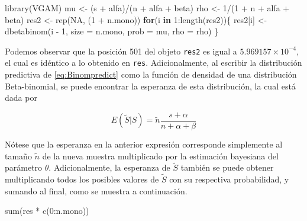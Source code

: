 \documentclass[
  12pt,
  spanish,
]{book}
\newenvironment{Shaded}{\begin{snugshade}}{\end{snugshade}}
\newcommand{\AttributeTok}[1]{\textcolor[rgb]{0.77,0.63,0.00}{#1}}
\newcommand{\ConstantTok}[1]{\textcolor[rgb]{0.00,0.00,0.00}{#1}}
\newcommand{\ControlFlowTok}[1]{\textcolor[rgb]{0.13,0.29,0.53}{\textbf{#1}}}
\newcommand{\DecValTok}[1]{\textcolor[rgb]{0.00,0.00,0.81}{#1}}
\newcommand{\FunctionTok}[1]{\textcolor[rgb]{0.00,0.00,0.00}{#1}}
\newcommand{\NormalTok}[1]{#1}
\newcommand{\OtherTok}[1]{\textcolor[rgb]{0.56,0.35,0.01}{#1}}
\newcommand{\SpecialCharTok}[1]{\textcolor[rgb]{0.00,0.00,0.00}{#1}}
\theoremstyle{definition}
\theoremstyle{definition}
\theoremstyle{definition}
\theoremstyle{definition}
\theoremstyle{remark}
\begin{document}
\begin{Shaded}
\begin{Highlighting}[]
\FunctionTok{library}\NormalTok{(VGAM) }
\NormalTok{mu }\OtherTok{\textless{}{-}}\NormalTok{ (s }\SpecialCharTok{+}\NormalTok{ alfa)}\SpecialCharTok{/}\NormalTok{(n }\SpecialCharTok{+}\NormalTok{ alfa }\SpecialCharTok{+}\NormalTok{ beta)}
\NormalTok{rho }\OtherTok{\textless{}{-}} \DecValTok{1}\SpecialCharTok{/}\NormalTok{(}\DecValTok{1} \SpecialCharTok{+}\NormalTok{ n }\SpecialCharTok{+}\NormalTok{ alfa }\SpecialCharTok{+}\NormalTok{ beta) }
\NormalTok{res2 }\OtherTok{\textless{}{-}} \FunctionTok{rep}\NormalTok{(}\ConstantTok{NA}\NormalTok{, (}\DecValTok{1} \SpecialCharTok{+}\NormalTok{ n.mono)) }
\ControlFlowTok{for}\NormalTok{(i }\ControlFlowTok{in} \DecValTok{1}\SpecialCharTok{:}\FunctionTok{length}\NormalTok{(res2))\{}
\NormalTok{  res2[i] }\OtherTok{\textless{}{-}} \FunctionTok{dbetabinom}\NormalTok{(i }\SpecialCharTok{{-}} \DecValTok{1}\NormalTok{,}
                        \AttributeTok{size =}\NormalTok{ n.mono,}
                        \AttributeTok{prob =}\NormalTok{ mu,}
                        \AttributeTok{rho =}\NormalTok{ rho)}
\NormalTok{\}}
\end{Highlighting}
\end{Shaded}

Podemos observar que la posición 501 del objeto \texttt{res2} es igual a \ensuremath{5.969157\times 10^{-4}}, el cual es idéntico a lo obtenido en \texttt{res}. Adicionalmente, al escribir la distribución predictiva de
\eqref{eq:Binompredict} como la función de densidad de una distribución
Beta-binomial, se puede encontrar la esperanza de esta distribución, la
cual está dada por

\begin{equation*}
E(\tilde{S}|S)=\tilde{n}\frac{s+\alpha}{n+\alpha+\beta}
\end{equation*}

Nótese que la esperanza en la anterior expresión corresponde simplemente
al tamaño \(\tilde{n}\) de la nueva muestra multiplicado por la
estimación bayesiana del parámetro \(\theta\). Adicionalmente, la
esperanza de \(\tilde{S}\) también se puede obtener multiplicando todos los
posibles valores de \(\tilde{S}\) con su respectiva probabilidad, y sumando
al final, como se muestra a continuación.

\begin{Shaded}
\begin{Highlighting}[]
\FunctionTok{sum}\NormalTok{(res }\SpecialCharTok{*} \FunctionTok{c}\NormalTok{(}\DecValTok{0}\SpecialCharTok{:}\NormalTok{n.mono)) }
\end{Highlighting}
\end{Shaded}
\end{document}
